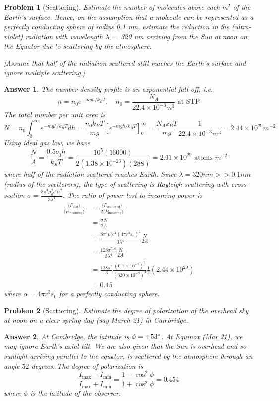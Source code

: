 \documentclass[a4paper]{article}
\newtheorem{ans}{Answer}
\theoremstyle{new}
\newtheorem{qns}{Problem}
\begin{document}
\newpage
\begin{qns}[Scattering]
Estimate the number of molecules above each m$^2$ of the Earth’s surface. Hence, on the assumption that a molecule can be represented as a perfectly conducting sphere of radius 0.1 nm, estimate the reduction in the (ultra-violet) radiation with wavelength $\lambda=$ 320 nm arriving from the Sun at noon on the Equator due to scattering by the atmosphere.

[Assume that half of the radiation scattered still reaches the Earth’s surface and ignore multiple scattering.]
\end{qns}
\begin{ans}
The number density profile is an exponential fall off, i.e.
$$n=n_0e^{-mgh/k_BT},\quad n_0=\frac{N_A}{22.4\times10^{-3}m^{3}}\text{ at STP}$$
The total number per unit area is
$$N=n_0\int_0^\infty e^{-mgh/k_BT}dh=\frac{n_0k_BT}{mg}[e^{-mgh/k_BT}]_0^\infty=\frac{N_Ak_BT}{mg}\frac{1}{22.4\times10^{-3}m^3}=2.44\times10^{29}m^{-2}$$
Using ideal gas law, we have
$$\frac{N}{A}=\frac{0.5p_0h}{k_BT}=\frac{10^5(16000)}{2(1.38\times10^{-23})(288)}=2.01\times10^{29}\text{ atoms }m^{-2}$$
where half of the radiation scattered reaches Earth. Since $\lambda=320 nm>>0.1 nm$ (radius of the scatterers), the type of scattering is Rayleigh scattering with cross-section $\sigma=\frac{8\pi^3\mu_0^2c^4\alpha^2}{3\lambda^4}$. The ratio of power lost to incoming power is
\begin{align}
    \frac{\langle P_{\text{lost}}\rangle}{\langle P_{\text{incoming}}\rangle}&=\frac{\langle P_{\text{scattered}}\rangle}{2\langle P_{\text{incoming}}\rangle}\nonumber\\&=\frac{\sigma N}{2A}\nonumber\\&=\frac{8\pi^3\mu_0^2c^4(4\pi r^3\varepsilon_0)^2}{3\lambda^4}\frac{N}{2A}\nonumber\\&=\frac{128\pi^5r^6}{3\lambda^4}\frac{N}{2A}\nonumber\\&=\frac{128\pi^5}{3}\frac{(0.1\times10^{-9})^6}{(320\times10^{-9})^4}\frac{1}{2}(2.44\times10^{29})\nonumber\\&=0.15\nonumber
\end{align}
where $\alpha=4\pi r^3\varepsilon_0$ for a perfectly conducting sphere.
\end{ans}
\begin{qns}[Scattering]
Estimate the degree of polarization of the overhead sky at noon on a clear spring day (say March 21) in Cambridge.
\end{qns}
\begin{ans}
At Cambridge, the latitude is $\phi=+53\degree$. At Equinox (Mar 21), we may ignore Earth's axial tilt. We are also given that the Sun is overhead and so sunlight arriving parallel to the equator, is scattered by the atmosphere through an angle $52$ degrees. The degree of polarization is
$$\frac{I_{\text{max}}-I_{\text{min}}}{I_{\text{max}}+I_{\text{min}}}=\frac{1-\cos^2\phi}{1+\cos^2\phi}=0.454$$
where $\phi$ is the latitude of the observer. 
\end{ans}
\newpage
\end{document}
